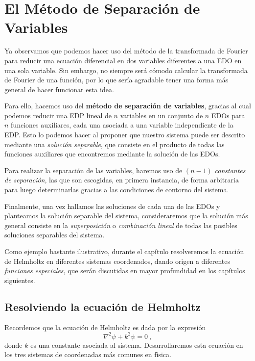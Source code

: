 \chapter{El Método de Separación de Variables} \label{chap:MSV}

Ya observamos que podemos hacer uso del método de la transformada de Fourier para reducir una ecuación diferencial en dos variables diferentes a una EDO en una sola variable. Sin embargo, no siempre será cómodo calcular la transformada de Fourier de una función, por lo que sería agradable tener una forma más general de hacer funcionar esta idea.

Para ello, hacemos uso del \textbf{método de separación de variables}, gracias al cual podemos reducir una EDP lineal de $n$ variables en un conjunto de $n$ EDOs para $n$ funciones auxiliares, cada una asociada a una variable independiente de la EDP. Esto lo podemos hacer al proponer que nuestro sistema puede ser descrito mediante una \emph{solución separable}, que consiste en el producto de todas las funciones auxiliares que encontremos mediante la solución de las EDOs.

Para realizar la separación de las variables, haremos uso de $(n-1)$ \emph{constantes de separación}, las que son escogidas, en primera instancia, de forma arbitraria para luego determinarlas gracias a las condiciones de contorno del sistema.

Finalmente, una vez hallamos las soluciones de cada una de las EDOs y planteamos la solución separable del sistema, consideraremos que la solución más general consiste en la \emph{superposición} o \emph{combinación lineal} de todas las posibles soluciones separables del sistema.

Como ejemplo bastante ilustrativo, durante el capítulo resolveremos la ecuación de Helm\-holtz en diferentes sistemas coordenados, dando origen a diferentes \emph{funciones especiales}, que serán discutidas en mayor profundidad en los capítulos siguientes.

\section{Resolviendo la ecuación de Helmholtz}

Recordemos que la ecuación de Helmholtz es dada por la expresión
\begin{equation}\label{eq:Helmholtz}
    \nabla^2 \psi + k^2 \psi = 0 \ ,
\end{equation}
donde $k$ es una constante asociada al sistema. Desarrollaremos esta ecuación en los tres sistemas de coordenadas más comunes en física.

